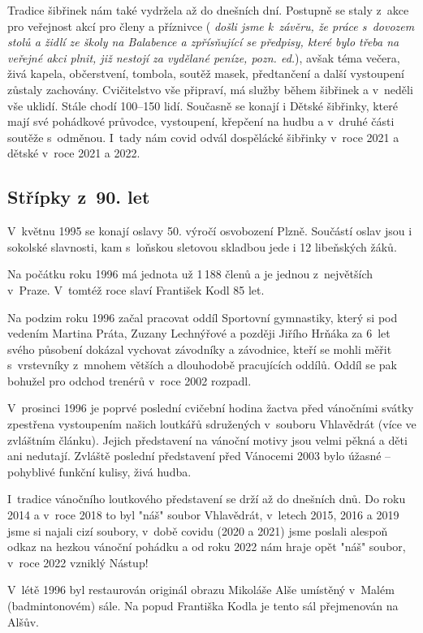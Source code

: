 \documentclass[a5paper, 11pt, twoside]{article}
\newcommand{\pozned}[1]{%
\textit{#1}}
\begin{document}
Tradice šibřinek nám také vydržela až do dnešních dní. Postupně se staly
z~akce pro veřejnost akcí pro členy a příznivce (\pozned{došli jsme
k~závěru, že práce s~dovozem stolů a židlí ze školy na Balabence a
zpřísňující se předpisy, které bylo třeba na veřejné akci plnit, již
nestojí za vydělané peníze, pozn. ed.}), avšak téma večera, živá kapela,
občerstvení, tombola, soutěž masek, předtančení a další vystoupení
zůstaly zachovány. Cvičitelstvo vše připraví, má služby během šibřinek a
v~neděli vše uklidí. Stále chodí 100--150 lidí. Současně se konají i
Dětské šibřinky, které mají své pohádkové průvodce, vystoupení, křepčení
na hudbu a v~druhé části soutěže s~odměnou. I~tady nám covid odvál
dospělácké šibřinky v~roce 2021 a dětské v~roce 2021 a 2022.

\subsection{Střípky z~90. let}

V~květnu 1995 se konají oslavy 50. výročí osvobození Plzně. Součástí
oslav jsou i sokolské slavnosti, kam s~loňskou sletovou skladbou jede i
12 libeňských žáků.

Na počátku roku 1996 má jednota už 1\,188 členů a je jednou z~největších
v~Praze. V~tomtéž roce slaví František Kodl 85 let.

Na podzim roku 1996 začal pracovat oddíl Sportovní gymnastiky, který si
pod vedením Martina Práta, Zuzany Lechnýřové a později Jiřího Hrňáka za
6~let svého působení dokázal vychovat závodníky a závodnice, kteří se
mohli měřit s~vrstevníky z~mnohem větších a dlouhodobě pracujících
oddílů. Oddíl se pak bohužel pro odchod trenérů v~roce 2002 rozpadl.

V~prosinci 1996 je poprvé poslední cvičební hodina žactva před vánočními
svátky zpestřena vystoupením našich loutkářů sdružených v~souboru
Vhlavědrát (více ve zvláštním článku). Jejich představení na vánoční
motivy jsou velmi pěkná a děti ani nedutají. Zvláště poslední
představení před Vánocemi 2003 bylo úžasné -- pohyblivé funkční kulisy,
živá hudba.

I~tradice vánočního loutkového představení se drží až do dnešních dnů.
Do roku 2014 a v~roce 2018 to byl "náš" soubor Vhlavědrát, v~letech
2015, 2016 a 2019 jsme si najali cizí soubory, v~době covidu (2020 a
2021) jsme poslali alespoň odkaz na hezkou vánoční pohádku a od roku
2022 nám hraje opět "náš" soubor, v~roce 2022 vzniklý Nástup!

V~létě 1996 byl restaurován originál obrazu Mikoláše Alše umístěný
v~Malém (badmintonovém) sále. Na popud Františka Kodla je tento sál
přejmenován na Alšův.
\end{document}
